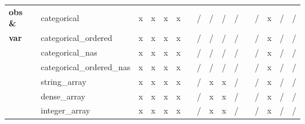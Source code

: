 \documentclass{article}
\begin{document}
\begin{longtable}{llllllllllllllll}
\textbf{obs \&} & categorical               & \cellcolor[HTML]{B7E1CD}x & \cellcolor[HTML]{B7E1CD}x & \cellcolor[HTML]{B7E1CD}x & \cellcolor[HTML]{B7E1CD}x &  & \cellcolor[HTML]{F4CCCC}/ & \cellcolor[HTML]{F4CCCC}/ & \cellcolor[HTML]{F4CCCC}/ & \cellcolor[HTML]{F4CCCC}/ &  & \cellcolor[HTML]{F4CCCC}/ & \cellcolor[HTML]{B7E1CD}x & \cellcolor[HTML]{F4CCCC}/ & \cellcolor[HTML]{F4CCCC}/ \\
\textbf{var}    & categorical\_ordered      & \cellcolor[HTML]{B7E1CD}x & \cellcolor[HTML]{B7E1CD}x & \cellcolor[HTML]{B7E1CD}x & \cellcolor[HTML]{B7E1CD}x &  & \cellcolor[HTML]{F4CCCC}/ & \cellcolor[HTML]{F4CCCC}/ & \cellcolor[HTML]{F4CCCC}/ & \cellcolor[HTML]{F4CCCC}/ &  & \cellcolor[HTML]{F4CCCC}/ & \cellcolor[HTML]{B7E1CD}x & \cellcolor[HTML]{F4CCCC}/ & \cellcolor[HTML]{F4CCCC}/ \\
                & categorical\_nas          & \cellcolor[HTML]{B7E1CD}x & \cellcolor[HTML]{B7E1CD}x & \cellcolor[HTML]{B7E1CD}x & \cellcolor[HTML]{B7E1CD}x &  & \cellcolor[HTML]{F4CCCC}/ & \cellcolor[HTML]{F4CCCC}/ & \cellcolor[HTML]{F4CCCC}/ & \cellcolor[HTML]{F4CCCC}/ &  & \cellcolor[HTML]{F4CCCC}/ & \cellcolor[HTML]{B7E1CD}x & \cellcolor[HTML]{F4CCCC}/ & \cellcolor[HTML]{F4CCCC}/ \\
                & categorical\_ordered\_nas & \cellcolor[HTML]{B7E1CD}x & \cellcolor[HTML]{B7E1CD}x & \cellcolor[HTML]{B7E1CD}x & \cellcolor[HTML]{B7E1CD}x &  & \cellcolor[HTML]{F4CCCC}/ & \cellcolor[HTML]{F4CCCC}/ & \cellcolor[HTML]{F4CCCC}/ & \cellcolor[HTML]{F4CCCC}/ &  & \cellcolor[HTML]{F4CCCC}/ & \cellcolor[HTML]{B7E1CD}x & \cellcolor[HTML]{F4CCCC}/ & \cellcolor[HTML]{F4CCCC}/ \\
                & string\_array             & \cellcolor[HTML]{B7E1CD}x & \cellcolor[HTML]{B7E1CD}x & \cellcolor[HTML]{B7E1CD}x & \cellcolor[HTML]{B7E1CD}x &  & \cellcolor[HTML]{F4CCCC}/ & \cellcolor[HTML]{B7E1CD}x & \cellcolor[HTML]{B7E1CD}x & \cellcolor[HTML]{F4CCCC}/ &  & \cellcolor[HTML]{F4CCCC}/ & \cellcolor[HTML]{B7E1CD}x & \cellcolor[HTML]{F4CCCC}/ & \cellcolor[HTML]{F4CCCC}/ \\
                & dense\_array              & \cellcolor[HTML]{B7E1CD}x & \cellcolor[HTML]{B7E1CD}x & \cellcolor[HTML]{B7E1CD}x & \cellcolor[HTML]{B7E1CD}x &  & \cellcolor[HTML]{F4CCCC}/ & \cellcolor[HTML]{B7E1CD}x & \cellcolor[HTML]{B7E1CD}x & \cellcolor[HTML]{F4CCCC}/ &  & \cellcolor[HTML]{F4CCCC}/ & \cellcolor[HTML]{B7E1CD}x & \cellcolor[HTML]{F4CCCC}/ & \cellcolor[HTML]{F4CCCC}/ \\
                & integer\_array            & \cellcolor[HTML]{B7E1CD}x & \cellcolor[HTML]{B7E1CD}x & \cellcolor[HTML]{B7E1CD}x & \cellcolor[HTML]{B7E1CD}x &  & \cellcolor[HTML]{F4CCCC}/ & \cellcolor[HTML]{B7E1CD}x & \cellcolor[HTML]{B7E1CD}x & \cellcolor[HTML]{F4CCCC}/ &  & \cellcolor[HTML]{F4CCCC}/ & \cellcolor[HTML]{B7E1CD}x & \cellcolor[HTML]{F4CCCC}/ & \cellcolor[HTML]{F4CCCC}/ \\

\end{longtable}
\end{document}
